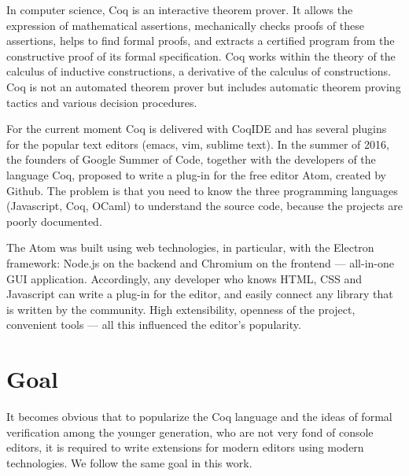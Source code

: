 








\Intro

In computer science, Coq is an interactive theorem prover. It allows the expression of mathematical assertions, mechanically checks proofs of these assertions, helps to find formal proofs, and extracts a certified program from the constructive proof of its formal specification. Coq works within the theory of the calculus of inductive constructions, a derivative of the calculus of constructions. Coq is not an automated theorem prover but includes automatic theorem proving tactics and various decision procedures.

For the current moment Coq is delivered with CoqIDE and has several plugins for the popular text editors (emacs, vim, sublime text). In the summer of 2016, the founders of Google Summer of Code, together with the developers of the language Coq, proposed to write a plug-in for the free editor Atom, created by Github. The problem is that you need to know the three programming languages (Javascript, Coq, OCaml) to understand the source code, because the projects are poorly documented.

The Atom was built using web technologies, in particular, with the Electron framework: Node.js on the backend and Chromium on the frontend --- all-in-one GUI application. Accordingly, any developer who knows HTML, CSS and Javascript can write a plug-in for the editor, and easily connect any library that is written by the community. High extensibility, openness of the project, convenient tools --- all this influenced the editor's popularity.

\section*{Goal}

It becomes obvious that to popularize the Coq language and the ideas of formal verification among the younger generation, who are not very fond of console editors, it is required to write extensions for modern editors using modern technologies. We follow the same goal in this work.

